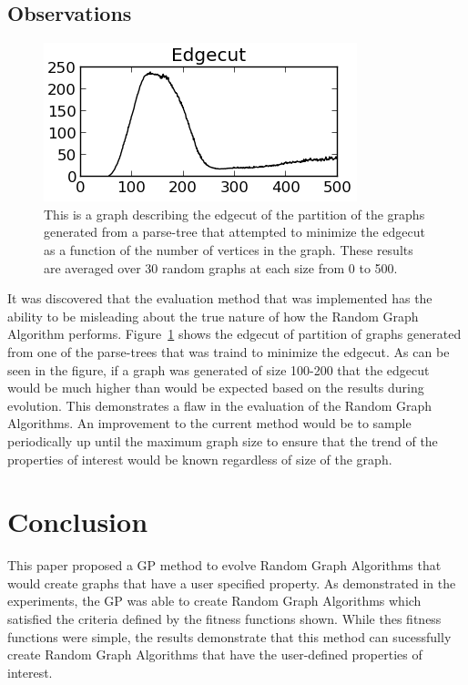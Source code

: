 \documentclass{article}
\begin{document}
\subsection{Observations}


\begin{figure}
\begin{centering}
  \includegraphics[scale=1]{mislead.png}
  \caption{This is a graph describing the edgecut of the partition of the graphs generated from a parse-tree that attempted to minimize the edgecut as a function of the number of vertices in the graph. 
    These results are averaged over 30 random graphs at each size from 0 to 500.}
  \label{fig:mislead}
\end{centering}
\end{figure}



It was discovered that the evaluation method that was implemented has the ability to be misleading about the true nature of how the
Random Graph Algorithm performs. Figure~\ref{fig:mislead} shows the edgecut of partition of graphs generated from one of the parse-trees
that was traind to minimize the edgecut. As can be seen in the figure, if a graph was generated of size 100-200 that the edgecut would be
much higher than would be expected based on the results during evolution. This demonstrates a flaw in the evaluation of the Random Graph Algorithms.
An improvement to the current method would be to sample periodically up until the maximum graph size to ensure that the trend of the
properties of interest would be known regardless of size of the graph.



\section{Conclusion}
This paper proposed a GP method to evolve Random Graph Algorithms that would create graphs that have a user specified property. As demonstrated
in the experiments, the GP was able to create Random Graph Algorithms which satisfied the criteria defined by the fitness functions shown. While thes
fitness functions were simple, the results demonstrate that this method can sucessfully create Random Graph Algorithms that have the user-defined 
properties of interest. 
\end{document}
